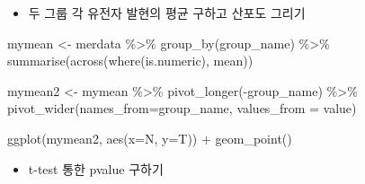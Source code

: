 \documentclass[
]{book}
\newenvironment{Shaded}{\begin{snugshade}}{\end{snugshade}}
\newcommand{\AttributeTok}[1]{\textcolor[rgb]{0.77,0.63,0.00}{#1}}
\newcommand{\CommentTok}[1]{\textcolor[rgb]{0.56,0.35,0.01}{\textit{#1}}}
\newcommand{\DecValTok}[1]{\textcolor[rgb]{0.00,0.00,0.81}{#1}}
\newcommand{\FunctionTok}[1]{\textcolor[rgb]{0.00,0.00,0.00}{#1}}
\newcommand{\NormalTok}[1]{#1}
\newcommand{\OtherTok}[1]{\textcolor[rgb]{0.56,0.35,0.01}{#1}}
\newcommand{\SpecialCharTok}[1]{\textcolor[rgb]{0.00,0.00,0.00}{#1}}
\providecommand{\tightlist}{%
  \setlength{\itemsep}{0pt}\setlength{\parskip}{0pt}}
\begin{document}
\begin{itemize}
\tightlist
\item
  두 그룹 각 유전자 발현의 평균 구하고 산포도 그리기
\end{itemize}

\begin{Shaded}
\begin{Highlighting}[]
\NormalTok{mymean }\OtherTok{\textless{}{-}}\NormalTok{ merdata }\SpecialCharTok{\%\textgreater{}\%} 
  \FunctionTok{group\_by}\NormalTok{(group\_name) }\SpecialCharTok{\%\textgreater{}\%} 
  \FunctionTok{summarise}\NormalTok{(}\FunctionTok{across}\NormalTok{(}\FunctionTok{where}\NormalTok{(is.numeric), mean))}

\NormalTok{mymean2 }\OtherTok{\textless{}{-}}\NormalTok{ mymean }\SpecialCharTok{\%\textgreater{}\%} 
  \FunctionTok{pivot\_longer}\NormalTok{(}\SpecialCharTok{{-}}\NormalTok{group\_name) }\SpecialCharTok{\%\textgreater{}\%} 
  \FunctionTok{pivot\_wider}\NormalTok{(}\AttributeTok{names\_from=}\NormalTok{group\_name, }\AttributeTok{values\_from =}\NormalTok{ value)}


\FunctionTok{ggplot}\NormalTok{(mymean2, }\FunctionTok{aes}\NormalTok{(}\AttributeTok{x=}\NormalTok{N, }\AttributeTok{y=}\NormalTok{T)) }\SpecialCharTok{+}
  \FunctionTok{geom\_point}\NormalTok{()}
\end{Highlighting}
\end{Shaded}

\begin{itemize}
\tightlist
\item
  t-test 통한 pvalue 구하기
\end{itemize}

\begin{Shaded}
\end{Shaded}
\end{document}
